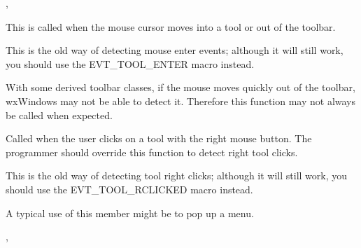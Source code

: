 
,\rtfsp
{}

\label{wxtoolbaronmouseenter}


This is called when the mouse cursor moves into a tool or out of
the toolbar.

This is the old way of detecting mouse enter events; although it will still work,
you should use the EVT\_TOOL\_ENTER macro instead.




With some derived toolbar classes, if the mouse moves quickly out of the toolbar, wxWindows may not be able to
detect it. Therefore this function may not always be called when expected.

\label{wxtoolbaronrightclick}


Called when the user clicks on a tool with the right mouse button. The
programmer should override this function to detect right tool clicks.

This is the old way of detecting tool right clicks; although it will still work,
you should use the EVT\_TOOL\_RCLICKED macro instead.






A typical use of this member might be to pop up a menu.


,\rtfsp
{}

